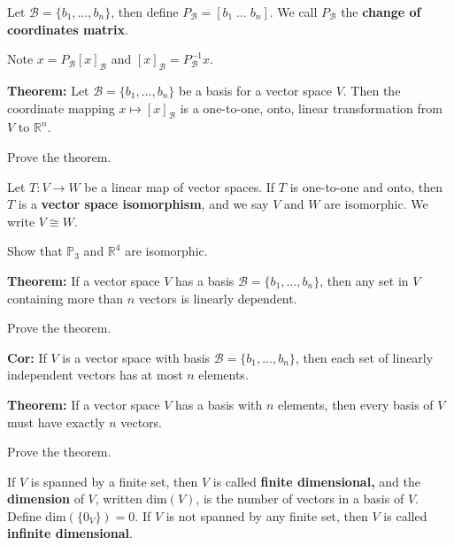 \documentclass[12pt,letterpaper]{article}
\begin{document}
\begin{enumerate}
\vfill

\begin{defn} Let $\mathcal{B}=\{b_1, \dots, b_n\}$, then define $P_\mathcal{B}=[b_1 \; \dots \; b_n]$. We call $P_\mathcal{B}$ the {\bf change of coordinates matrix}.
\end{defn}
Note $x = P_\mathcal{B} [x]_{\mathcal{B}}$ and $[x]_\mathcal{B}=P_{\mathcal{B}}^{-1} x.$

{\bf Theorem:} Let $\mathcal{B}=\{ b_1, \dots, b_n\}$ be a basis for a vector space $V$. Then the coordinate mapping $x \mapsto [x]_\mathcal{B}$ is a one-to-one, onto, linear transformation from $V$ to $\mathbb{R}^n$.

\Problem Prove the theorem.

\vfill

\newpage

\begin{defn}
	Let $T: V \to W$ be a linear map of vector spaces. If $T$ is one-to-one and onto, then $T$ is a {\bf vector space isomorphism}, and we say $V$ and $W$ are isomorphic. We write $V \cong W$.
\end{defn}

\Problem Show that $\mathbb{P}_3$ and $\mathbb{R}^4$ are isomorphic.

\vfill

{\bf Theorem:} If a vector space $V$ has a basis $\mathcal{B}=\{b_1, \dots, b_n\}$, then any set in $V$ containing more than $n$ vectors is linearly dependent.

\Problem Prove the theorem.

\vfill

{\bf Cor:} If $V$ is a vector space with basis $\mathcal{B}=\{b_1, \dots, b_n\}$, then each set of linearly independent vectors has at most $n$ elements.

{\bf Theorem:} If a vector space $V$ has a basis with $n$ elements, then every basis of $V$ must have exactly $n$ vectors.

\Problem Prove the theorem.

\vfill

\begin{defn}
If $V$ is spanned by a finite set, then $V$ is called {\bf finite dimensional,} and the {\bf dimension} of $V$, written $\text{dim}(V)$, is the number of vectors in a basis of $V$. Define $\text{dim}(\{0_V\})=0$. If $V$ is not spanned by any finite set, then $V$ is called {\bf infinite dimensional}.
\end{defn}

\end{enumerate}
\end{document}

